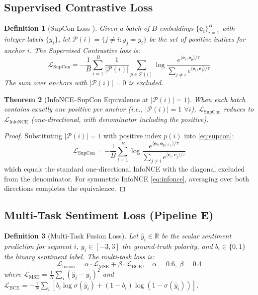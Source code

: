 \documentclass[10pt,conference]{IEEEtran}
\theoremstyle{ieeethm}
\newtheorem{theorem}{Theorem}
\theoremstyle{ieeedef}
\newtheorem{definition}[theorem]{Definition}
\theoremstyle{ieeeremark}
\begin{document}
\subsection{Supervised Contrastive Loss}

\begin{definition}[SupCon Loss \cite{khosla2020supervised}]
\label{def:supcon}
Given a batch of $B$ embeddings $\{\mathbf{e}_i\}_{i=1}^B$ with integer labels $\{y_i\}$, let $\mathcal{P}(i) = \{j \neq i : y_j = y_i\}$ be the set of positive indices for anchor $i$. The Supervised Contrastive loss is:
\begin{equation}
\mathcal{L}_{\text{SupCon}} = -\frac{1}{B}\sum_{i=1}^{B}
  \frac{1}{|\mathcal{P}(i)|}\sum_{p \in \mathcal{P}(i)}
  \log\frac{e^{\langle\mathbf{e}_i,\mathbf{e}_p\rangle/\tau}}
           {\sum_{j \neq i} e^{\langle\mathbf{e}_i,\mathbf{e}_j\rangle/\tau}}
\label{eq:supcon}
\end{equation}
The sum over anchors with $|\mathcal{P}(i)| = 0$ is excluded.
\end{definition}

\begin{theorem}[InfoNCE–SupCon Equivalence at $|\mathcal{P}(i)|=1$]
\label{thm:equivalence}
When each batch contains exactly one positive per anchor (i.e., $|\mathcal{P}(i)| = 1$ $\forall i$), $\mathcal{L}_{\text{SupCon}}$ reduces to $\mathcal{L}_{\text{InfoNCE}}$ (one-directional, with denominator including the positive).
\end{theorem}
\begin{proof}
Substituting $|\mathcal{P}(i)| = 1$ with positive index $p(i)$ into \eqref{eq:supcon}:
\[
\mathcal{L}_{\text{SupCon}} = -\frac{1}{B}\sum_{i=1}^B \log\frac{e^{\langle\mathbf{e}_i,\mathbf{e}_{p(i)}\rangle/\tau}}{\sum_{j \neq i}e^{\langle\mathbf{e}_i,\mathbf{e}_j\rangle/\tau}}
\]
which equals the standard one-directional InfoNCE with the diagonal excluded from the denominator. For symmetric InfoNCE \eqref{eq:infonce}, averaging over both directions completes the equivalence.
\end{proof}

\subsection{Multi-Task Sentiment Loss (Pipeline E)}

\begin{definition}[Multi-Task Fusion Loss]
\label{def:multitask}
Let $\hat{y}_i \in \mathbb{R}$ be the scalar sentiment prediction for segment $i$, $y_i \in [-3,3]$ the ground-truth polarity, and $b_i \in \{0,1\}$ the binary sentiment label. The multi-task loss is:
\begin{equation}
\mathcal{L}_{\text{fusion}} = \alpha \cdot \mathcal{L}_{\text{MSE}} + \beta \cdot \mathcal{L}_{\text{BCE}},\quad \alpha=0.6,\ \beta=0.4
\label{eq:fusion_loss}
\end{equation}
where $\mathcal{L}_{\text{MSE}} = \frac{1}{N}\sum_i(\hat{y}_i - y_i)^2$ and $\mathcal{L}_{\text{BCE}} = -\frac{1}{N}\sum_i[b_i \log\sigma(\hat{y}_i) + (1{-}b_i)\log(1{-}\sigma(\hat{y}_i))]$.
\end{definition}
\end{document}
